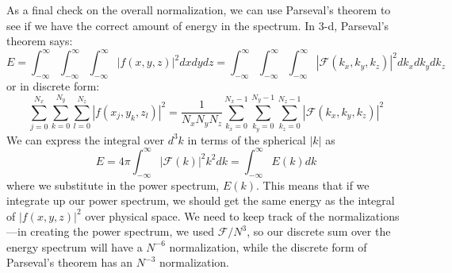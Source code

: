 \documentclass[11pt]{article}
\begin{document}
As a final check on the overall normalization, we can use Parseval's theorem
to see if we have the correct amount of energy in the spectrum.  In 3-d,
Parseval's theorem says:
\begin{equation}
E = \int_{-\infty}^{\infty} \int_{-\infty}^{\infty} \int_{-\infty}^{\infty} |f(x,y,z)|^2 dx dy dz = 
  \int_{-\infty}^{\infty} \int_{-\infty}^{\infty} \int_{-\infty}^{\infty}  |\mathcal{F}(k_x,k_y,k_z)|^2 dk_x dk_y dk_z
\end{equation}
or in discrete form:
\begin{equation}
\sum_{j=0}^{N_x} \sum_{k=0}^{N_y} \sum_{l=0}^{N_z}
   | f(x_j, y_k, z_l) |^2 = \frac{1}{N_x N_y N_z} 
 \sum_{k_x=0}^{N_x-1} \sum_{k_y=0}^{N_y-1} \sum_{k_z=0}^{N_z-1} 
   | \mathcal{F}(k_x, k_y, k_z) |^2
\end{equation}
We can express the integral over $d^3k$ in terms of the spherical $|k|$ as
\begin{equation}
E = 4\pi \int_{-\infty}^{\infty} |\mathcal{F}(k)|^2 k^2 dk = \int_{-\infty}^{\infty} E(k) dk
\end{equation}
where we substitute in the power spectrum, $E(k)$.  This means that if we integrate up our
power spectrum, we should get the same energy as the integral
of $|f(x,y,z)|^2$ over physical space.  We need to keep track of the normalizations---in
creating the power spectrum, we used $\mathcal{F}/N^3$, so our discrete sum over the energy
spectrum will have a $N^{-6}$ normalization, while the discrete form of Parseval's theorem
has an $N^{-3}$ normalization.
\end{document}
